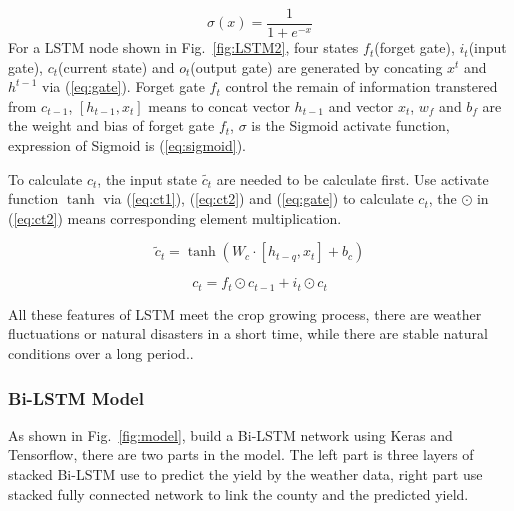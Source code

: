 \documentclass[conference, a4paper]{IEEEtran}
\begin{document}
      \begin{equation}
        \sigma \left( x \right) =\frac{1}{1+e^{-x}}
        \label{eq:sigmoid}
      \end{equation}
      For a LSTM node shown in Fig.~\ref{fig:LSTM2}, four states $f_t$(forget gate), $i_t$(input gate), $c_t$(current state) and $o_t$(output gate) are generated by concating $x^t$ and $h^{t-1}$ via (\ref{eq:gate}). Forget gate $f_t$ control the remain of information transtered from $c_{t-1}$, $[h_{t-1}, x_t]$  means to concat vector $h_{t-1}$ and vector $x_t$, $w_f$ and $b_f$ are the weight and bias of forget gate $f_t$, $\sigma$ is the Sigmoid activate function, expression of Sigmoid is (\ref{eq:sigmoid}).



      To calculate $c_t$, the input state $\widetilde{c_t}$ are needed to be calculate first. Use activate function $\tanh$ via (\ref{eq:ct1}), (\ref{eq:ct2}) and (\ref{eq:gate}) to calculate $c_t$, the $\odot$ in (\ref{eq:ct2}) means corresponding element multiplication.

      \begin{equation}
        \tilde{c}_t=\tanh \left( W_c\cdot \left[ h_{t-q},x_t \right] +b_c \right)
        \label{eq:ct1}
      \end{equation}

      \begin{equation}
        c_t=f_t\odot c_{t-1}+i_t\odot c_t
        \label{eq:ct2}
      \end{equation}

      All these features of LSTM meet the crop growing process, there are weather fluctuations or natural disasters in a short time, while there are stable natural conditions over a long period..

    \subsubsection{Bi-LSTM Model}
      As shown in Fig.~\ref{fig:model}, build a Bi-LSTM network using Keras and Tensorflow, there are two parts in the model. The left part is three layers of stacked Bi-LSTM use to predict the yield by the weather data, right part use stacked fully connected network to link the county and the predicted yield.
\end{document}
